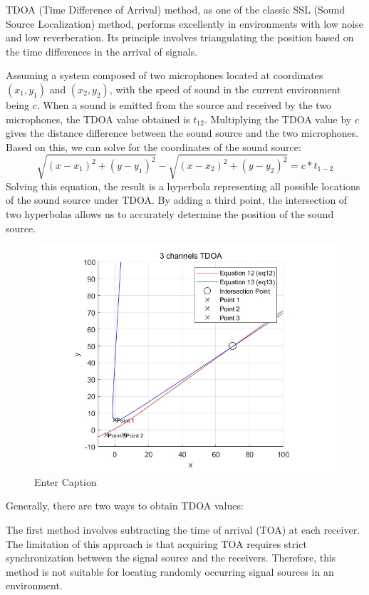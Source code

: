 
TDOA (Time Difference of Arrival) method, as one of the classic SSL (Sound Source Localization) method, performs excellently in environments with low noise and low reverberation. Its principle involves triangulating the position based on the time differences in the arrival of signals.

Assuming a system composed of two microphones located at coordinates \((x_1, y_1)\) and \((x_2, y_2)\), with the speed of sound in the current environment being \(c\). When a sound is emitted from the source and received by the two microphones, the TDOA value obtained is \(t_{12}\). Multiplying the TDOA value by \(c\) gives the distance difference between the sound source and the two microphones. Based on this, we can solve for the coordinates of the sound source:
\[
\sqrt{(x-x_{1})^{2}+(y-y_{1})^{2}}-\sqrt{(x-x_{2})^{2}+(y-y_{2})^{2}}=c*t_{1-2}
\]
Solving this equation, the result is a hyperbola representing all possible locations of the sound source under TDOA. By adding a third point, the intersection of two hyperbolas allows us to accurately determine the position of the sound source.\\
\begin{figure}[H]
    \centering
    \includegraphics[width=0.7\linewidth]{figures/3_Channels.jpg}
    \caption{Enter Caption}
    \label{fig:enter-label}
\end{figure}
Generally, there are two ways to obtain TDOA values: 

The first method involves subtracting the time of arrival (TOA) at each receiver. The limitation of this approach is that acquiring TOA requires strict synchronization between the signal source and the receivers. Therefore, this method is not suitable for locating randomly occurring signal sources in an environment.

